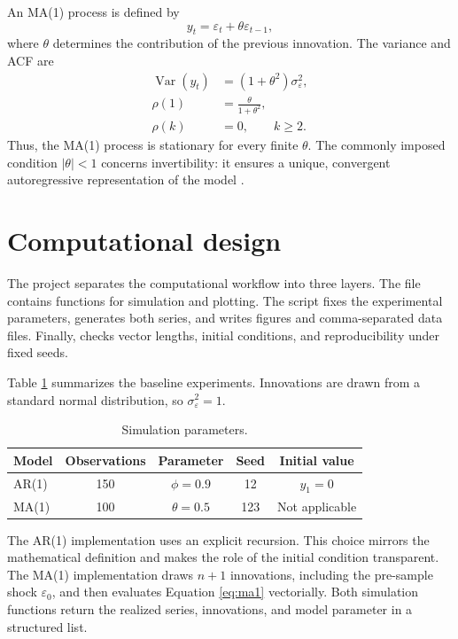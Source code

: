 \documentclass[10pt]{article}
\begin{document}
An MA(1) process is defined by
\begin{equation}
  y_t = \varepsilon_t + \theta\varepsilon_{t-1},
  \label{eq:ma1}
\end{equation}
where $\theta$ determines the contribution of the previous innovation. The
variance and ACF are
\begin{align}
  \operatorname{Var}(y_t)
    &= (1+\theta^2)\sigma_\varepsilon^2,\\
  \rho(1)
    &= \frac{\theta}{1+\theta^2},\\
  \rho(k)
    &= 0,\qquad k\geq 2.
  \label{eq:maacf}
\end{align}
Thus, the MA(1) process is stationary for every finite $\theta$. The commonly
imposed condition $|\theta|<1$ concerns invertibility: it ensures a unique,
convergent autoregressive representation of the model \cite{hamilton1994}.

\section{Computational design}

The project separates the computational workflow into three layers. The file
 contains functions for simulation and plotting.
The script  fixes the experimental parameters,
generates both series, and writes figures and comma-separated data files.
Finally,  checks vector lengths, initial
conditions, and reproducibility under fixed seeds.

Table \ref{tab:parameters} summarizes the baseline experiments. Innovations are
drawn from a standard normal distribution, so
$\sigma_\varepsilon^2=1$.

\begin{table}[htbp]
  \centering
  \caption{Simulation parameters.}
  \label{tab:parameters}
  \begin{tabular}{lcccc}
    \toprule
    Model & Observations & Parameter & Seed & Initial value \\
    \midrule
    AR(1) & 150 & $\phi=0.9$ & 12 & $y_1=0$ \\
    MA(1) & 100 & $\theta=0.5$ & 123 & Not applicable \\
    \bottomrule
  \end{tabular}
\end{table}

The AR(1) implementation uses an explicit recursion. This choice mirrors the
mathematical definition and makes the role of the initial condition
transparent. The MA(1) implementation draws $n+1$ innovations, including the
pre-sample shock $\varepsilon_0$, and then evaluates Equation
\eqref{eq:ma1} vectorially. Both simulation functions return the realized
series, innovations, and model parameter in a structured list.
\end{document}

